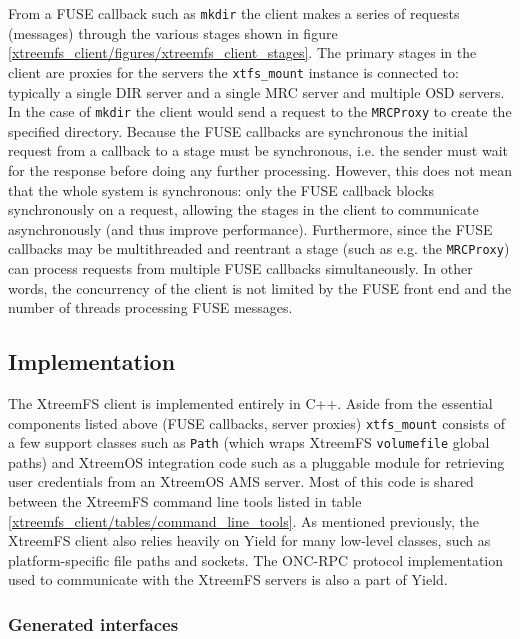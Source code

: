 From a FUSE callback such as \texttt{mkdir} the client makes a series of requests (messages) through the various stages shown in figure \ref{xtreemfs_client/figures/xtreemfs_client_stages}. The primary stages in the client are proxies for the servers the \texttt{xtfs\_mount} instance is connected to: typically a single DIR server and a single MRC server and multiple OSD servers. In the case of \texttt{mkdir} the client would send a request to the \texttt{MRCProxy} to create the specified directory. Because the FUSE callbacks are synchronous the initial request from a callback to a stage must be synchronous, i.e. the sender must wait for the response before doing any further processing. However, this does not mean that the whole system is synchronous: only the FUSE callback blocks synchronously on a request, allowing the stages in the client to communicate asynchronously (and thus improve performance). Furthermore, since the FUSE callbacks may be multithreaded and reentrant a stage (such as e.g. the \texttt{MRCProxy}) can process requests from multiple FUSE callbacks simultaneously. In other words, the concurrency of the client is not limited by the FUSE front end and the number of threads processing FUSE messages.

\subsection{Implementation}

The XtreemFS client is implemented entirely in C++. Aside from the essential components listed above (FUSE callbacks, server proxies) \texttt{xtfs\_mount} consists of a few support classes such as \texttt{Path} (which wraps XtreemFS \texttt{volume\/file} global paths) and XtreemOS integration code such as a pluggable module for retrieving user credentials from an XtreemOS AMS server. Most of this code is shared between the XtreemFS command line tools listed in table \ref{xtreemfs_client/tables/command_line_tools}. As mentioned previously, the XtreemFS client also relies heavily on Yield for many low-level classes, such as platform-specific file paths and sockets. The ONC-RPC \cite{RFC1831} protocol implementation used to communicate with the XtreemFS servers is also a part of Yield. 

\subsubsection{Generated interfaces}

